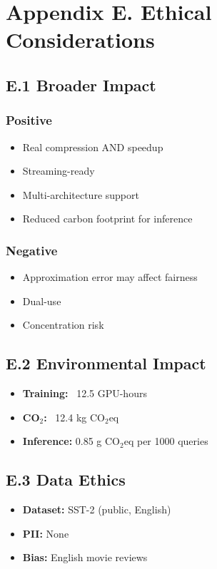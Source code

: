 
\section{Appendix E. Ethical Considerations}

\subsection{E.1 Broader Impact}

\subsubsection{Positive}
\begin{itemize}
\item Real compression AND speedup
\item Streaming-ready
\item Multi-architecture support
\item Reduced carbon footprint for inference

\end{itemize}
\subsubsection{Negative}
\begin{itemize}
\item Approximation error may affect fairness
\item Dual-use
\item Concentration risk

\end{itemize}
\subsection{E.2 Environmental Impact}

\begin{itemize}
\item \textbf{Training:} ~12.5 GPU-hours
\item \textbf{CO$_2$:} ~12.4 kg CO$_2$eq
\item \textbf{Inference:} 0.85 g CO$_2$eq per 1000 queries

\end{itemize}
\subsection{E.3 Data Ethics}

\begin{itemize}
\item \textbf{Dataset:} SST-2 (public, English)
\item \textbf{PII:} None
\item \textbf{Bias:} English movie reviews

\end{itemize}
